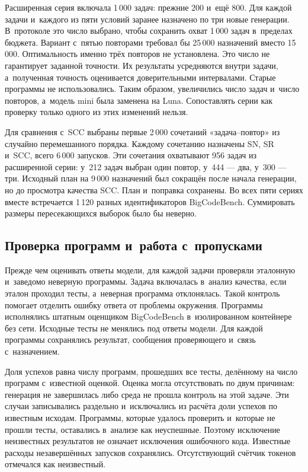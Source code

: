 Расширенная серия включала 1\,000 задач: прежние 200 и~ещё 800. Для каждой задачи и~каждого из пяти условий заранее назначено по три новые генерации. В~протоколе это число выбрано, чтобы сохранить охват 1\,000 задач в~пределах бюджета. Вариант с~пятью повторами требовал бы 25\,000 назначений вместо 15\,000. Оптимальность именно трёх повторов не установлена. Это число не гарантирует заданной точности. Их результаты усредняются внутри задачи, а~полученная точность оценивается доверительными интервалами. Старые программы не использовались. Таким образом, увеличились число задач и~число повторов, а~модель mini была заменена на Luna. Сопоставлять серии как проверку только одного из этих изменений нельзя.

Для сравнения с~SCC выбраны первые 2\,000 сочетаний «задача--повтор» из случайно перемешанного порядка. Каждому сочетанию назначены SN, SR и~SCC, всего 6\,000 запусков. Эти сочетания охватывают 956 задач из расширенной серии: у~212 задач выбран один повтор, у~444 --- два, у~300 --- три. Исходный план на 9\,000 назначений был сокращён после начала генерации, но до просмотра качества SCC. План и~поправка сохранены. Во всех пяти сериях вместе встречается 1\,120 разных идентификаторов BigCodeBench. Суммировать размеры пересекающихся выборок было бы неверно.

\subsection{Проверка программ и~работа с~пропусками}\label{subsec:missing-outcomes}
Прежде чем оценивать ответы модели, для каждой задачи проверяли эталонную и~заведомо неверную программы. Задача включалась в~анализ качества, если эталон проходил тесты, а~неверная программа отклонялась. Такой контроль помогает отделить ошибку ответа от проблемы окружения. Программы исполнялись штатным оценщиком BigCodeBench в~изолированном контейнере без сети. Исходные тесты не менялись под ответы модели. Для каждой программы сохранялись результат, сообщения проверяющего и~связь с~назначением.

Доля успехов равна числу программ, прошедших все тесты, делённому на число программ с~известной оценкой. Оценка могла отсутствовать по двум причинам: генерация не завершилась либо среда не прошла контроль на этой задаче. Эти случаи записывались раздельно и~исключались из расчёта доли успехов по известным исходам. Программы, которые удалось проверить и~которые не прошли тесты, оставались в~анализе как неуспешные. Поэтому исключение неизвестных результатов не означает исключения ошибочного кода. Известные расходы незавершённых запусков сохранялись. Отсутствующий счётчик токенов отмечался как неизвестный.

